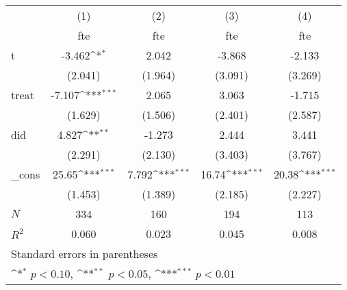{
\def\sym#1{\ifmmode^{#1}\else\(^{#1}\)\fi}
\begin{tabular}{l*{4}{c}}
\hline\hline
            &\multicolumn{1}{c}{(1)}&\multicolumn{1}{c}{(2)}&\multicolumn{1}{c}{(3)}&\multicolumn{1}{c}{(4)}\\
            &\multicolumn{1}{c}{fte}&\multicolumn{1}{c}{fte}&\multicolumn{1}{c}{fte}&\multicolumn{1}{c}{fte}\\
\hline
t           &      -3.462\sym{*}  &       2.042         &      -3.868         &      -2.133         \\
            &     (2.041)         &     (1.964)         &     (3.091)         &     (3.269)         \\
[1em]
treat       &      -7.107\sym{***}&       2.065         &       3.063         &      -1.715         \\
            &     (1.629)         &     (1.506)         &     (2.401)         &     (2.587)         \\
[1em]
did         &       4.827\sym{**} &      -1.273         &       2.444         &       3.441         \\
            &     (2.291)         &     (2.130)         &     (3.403)         &     (3.767)         \\
[1em]
\_cons      &       25.65\sym{***}&       7.792\sym{***}&       16.74\sym{***}&       20.38\sym{***}\\
            &     (1.453)         &     (1.389)         &     (2.185)         &     (2.227)         \\
\hline
\(N\)       &         334         &         160         &         194         &         113         \\
\(R^{2}\)   &       0.060         &       0.023         &       0.045         &       0.008         \\
\hline\hline
\multicolumn{5}{l}{\footnotesize Standard errors in parentheses}\\
\multicolumn{5}{l}{\footnotesize \sym{*} \(p<0.10\), \sym{**} \(p<0.05\), \sym{***} \(p<0.01\)}\\
\end{tabular}
}
